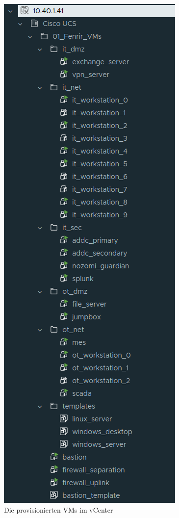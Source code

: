 \documentclass[
	headings=optiontotocandhead,%
	oneside,
	numbers=noenddot,%
	toc=flat, %
	10pt, %
	parskip=full, %
	listof=totoc, %
	listof=flat, %
	numbers=noenddot, %
	bibliography=totoc, %
	a4paper,DIV=14,
]{scrartcl}
\begin{document}
\begin{figure}[h]
	\centering
	\includegraphics[width=0.9\linewidth]{20241008_4}
	\caption[]{Die provisionierten VMs im vCenter}
\end{figure}
\FloatBarrier
\end{document}
